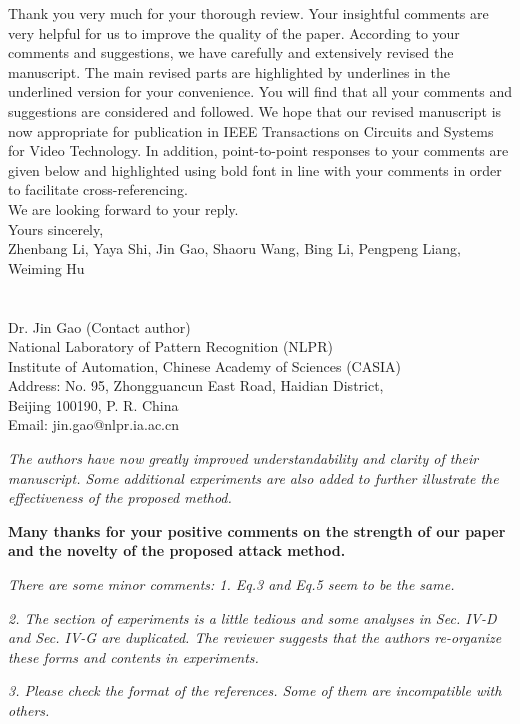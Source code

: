 \documentclass[12pt]{article}
\begin{document}
Thank you very much for your thorough review. Your insightful comments are very helpful for us to improve the quality of the paper. According to your comments and suggestions, we have carefully and extensively revised the manuscript. The main revised parts are highlighted by underlines in the underlined version for your convenience. You will find that all your comments and suggestions are considered and followed. We hope that our revised manuscript is now appropriate for publication in IEEE Transactions on Circuits and Systems for Video Technology.
In addition, point-to-point responses to your comments are given below and highlighted using bold font in line with your comments in order to facilitate cross-referencing.\\[10pt]
\indent We are looking forward to your reply.\\[10pt]
\noindent Yours sincerely,\\
\noindent Zhenbang Li, Yaya Shi, Jin Gao, Shaoru Wang, Bing Li, Pengpeng Liang, Weiming Hu
\\
\\
\\
\noindent Dr. Jin Gao (Contact author)\\
\noindent National Laboratory of Pattern Recognition (NLPR)\\
\noindent Institute of Automation, Chinese Academy of Sciences (CASIA)\\
\noindent Address: No. 95, Zhongguancun East Road, Haidian District,\\
\noindent Beijing 100190, P. R. China\\
\noindent Email: jin.gao@nlpr.ia.ac.cn

\newpage
\textit{The authors have now greatly improved understandability and clarity of their manuscript. Some additional experiments are also added to further illustrate the effectiveness of the proposed method.}

\textbf{Many thanks for your positive comments on the strength of our paper and the novelty of the proposed attack method.}

\textit{There are some minor comments: 1. Eq.3 and Eq.5 seem to be the same.}

\textit{2. The section of experiments is a little tedious and some analyses in Sec. IV-D and Sec. IV-G are duplicated. The reviewer suggests that the authors re-organize these forms and contents in experiments.}

\textit{3. Please check the format of the references. Some of them are incompatible with others.}
\end{document}

